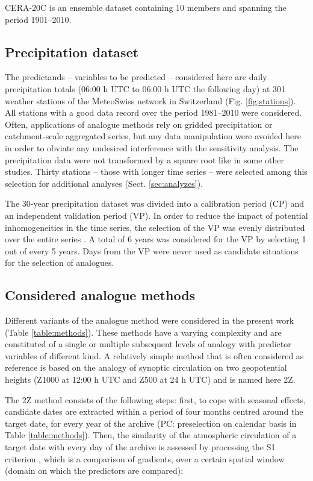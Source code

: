 \documentclass{ametsoc}
\begin{document}
CERA-20C is an ensemble dataset containing 10 members and spanning the period 1901--2010.



\subsection{Precipitation dataset}
\label{sec:precip}

The predictands -- variables to be predicted -- considered here are daily precipitation totals (06:00 h UTC to 06:00 h UTC the following day) at 301 weather stations of the MeteoSwiss network in Switzerland (Fig. \ref{fig:stations}). All stations with a good data record over the period 1981--2010 were considered. Often, applications of analogue methods rely on gridded precipitation or catchment-scale aggregated series, but any data manipulation were avoided here in order to obviate any undesired interference with the sensitivity analysis. The precipitation data were not transformed by a square root like in some other studies. Thirty stations -- those with longer time series -- were selected among this selection for additional analyses (Sect. \ref{sec:analyzes}).

The 30-year precipitation dataset was divided into a calibration period (CP) and an independent validation period (VP). In order to reduce the impact of potential inhomogeneities in the time series, the selection of the VP was evenly distributed over the entire series \citep{BenDaoud2010}. A total of 6 years was considered for the VP by selecting 1 out of every 5 years. Days from the VP were never used as candidate situations for the selection of analogues.


\subsection{Considered analogue methods}
\label{sec:ams}

Different variants of the analogue method were considered in the present work (Table \ref{table:methods}). These methods have a varying complexity and are constituted of a single or multiple subsequent levels of analogy with predictor variables of different kind. A relatively simple method that is often considered as reference is based on the analogy of synoptic circulation on two geopotential heights (Z1000 at 12:00 h UTC and Z500 at 24 h UTC) and is named here 2Z.

The 2Z method consists of the following steps: first, to cope with seasonal effects, candidate dates are extracted within a period of four months centred around the target date, for every year of the archive (PC: preselection on calendar basis in Table \ref{table:methods}). Then, the similarity of the atmospheric circulation of a target date with every day of the archive is assessed by processing the S1 criterion \citep[Eq.\ \ref{eq:S1}, ][]{Teweles1954, Drosdowsky2003}, which is a comparison of gradients, over a certain spatial window (domain on which the predictors are compared):
\end{document}
